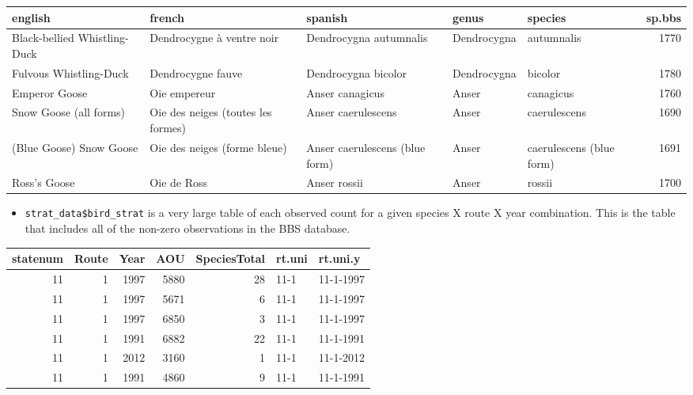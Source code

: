 \documentclass[
]{book}
\newenvironment{Shaded}{\begin{snugshade}}{\end{snugshade}}
\newcommand{\DecValTok}[1]{\textcolor[rgb]{0.00,0.00,0.81}{#1}}
\newcommand{\FunctionTok}[1]{\textcolor[rgb]{0.00,0.00,0.00}{#1}}
\newcommand{\NormalTok}[1]{#1}
\newcommand{\SpecialCharTok}[1]{\textcolor[rgb]{0.00,0.00,0.00}{#1}}
\providecommand{\tightlist}{%
  \setlength{\itemsep}{0pt}\setlength{\parskip}{0pt}}
\begin{document}
\begin{tabular}{l|l|l|l|l|r}
\hline
english & french & spanish & genus & species & sp.bbs\\
\hline
Black-bellied Whistling-Duck & Dendrocygne à ventre noir & Dendrocygna autumnalis & Dendrocygna & autumnalis & 1770\\
\hline
Fulvous Whistling-Duck & Dendrocygne fauve & Dendrocygna bicolor & Dendrocygna & bicolor & 1780\\
\hline
Emperor Goose & Oie empereur & Anser canagicus & Anser & canagicus & 1760\\
\hline
Snow Goose (all forms) & Oie des neiges (toutes les formes) & Anser caerulescens & Anser & caerulescens & 1690\\
\hline
(Blue Goose) Snow Goose & Oie des neiges (forme bleue) & Anser caerulescens (blue form) & Anser & caerulescens (blue form) & 1691\\
\hline
Ross's Goose & Oie de Ross & Anser rossii & Anser & rossii & 1700\\
\hline
\end{tabular}

\begin{itemize}
\tightlist
\item
  \texttt{strat\_data\$bird\_strat} is a very large table of each observed count for a given species X route X year combination. This is the table that includes all of the non-zero observations in the BBS database.
\end{itemize}

\begin{Shaded}
\end{Shaded}

\begin{tabular}{r|r|r|r|r|l|l}
\hline
statenum & Route & Year & AOU & SpeciesTotal & rt.uni & rt.uni.y\\
\hline
11 & 1 & 1997 & 5880 & 28 & 11-1 & 11-1-1997\\
\hline
11 & 1 & 1997 & 5671 & 6 & 11-1 & 11-1-1997\\
\hline
11 & 1 & 1997 & 6850 & 3 & 11-1 & 11-1-1997\\
\hline
11 & 1 & 1991 & 6882 & 22 & 11-1 & 11-1-1991\\
\hline
11 & 1 & 2012 & 3160 & 1 & 11-1 & 11-1-2012\\
\hline
11 & 1 & 1991 & 4860 & 9 & 11-1 & 11-1-1991\\
\hline
\end{tabular}
\end{document}
